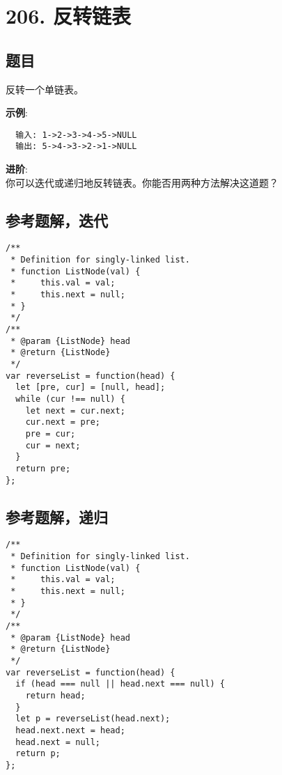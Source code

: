 \newpage
\section{206. 反转链表}
\label{leetcode:206}

\subsection{题目}

反转一个单链表。

\textbf{示例}:

\begin{verbatim}
  输入: 1->2->3->4->5->NULL
  输出: 5->4->3->2->1->NULL
\end{verbatim}

\textbf{进阶}: \\
你可以迭代或递归地反转链表。你能否用两种方法解决这道题？

\subsection{参考题解，迭代}

\begin{verbatim}
/**
 * Definition for singly-linked list.
 * function ListNode(val) {
 *     this.val = val;
 *     this.next = null;
 * }
 */
/**
 * @param {ListNode} head
 * @return {ListNode}
 */
var reverseList = function(head) {
  let [pre, cur] = [null, head];
  while (cur !== null) {
    let next = cur.next;
    cur.next = pre;
    pre = cur;
    cur = next;
  }
  return pre;
};
\end{verbatim}

\subsection{参考题解，递归}

\begin{verbatim}
/**
 * Definition for singly-linked list.
 * function ListNode(val) {
 *     this.val = val;
 *     this.next = null;
 * }
 */
/**
 * @param {ListNode} head
 * @return {ListNode}
 */
var reverseList = function(head) {
  if (head === null || head.next === null) {
    return head;
  }
  let p = reverseList(head.next);
  head.next.next = head;
  head.next = null;
  return p;
};
\end{verbatim}
